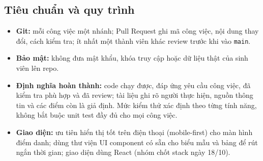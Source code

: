 \subsection*{Tiêu chuẩn và quy trình}
\begin{itemize}
  \item \textbf{Git:} mỗi công việc một nhánh; Pull Request ghi mã công việc, nội dung thay đổi, cách kiểm tra; ít nhất một thành viên khác review trước khi vào \texttt{main}.
  \item \textbf{Bảo mật:} không đưa mật khẩu, khóa truy cập hoặc dữ liệu thật của sinh viên lên repo.
  \item \textbf{Định nghĩa hoàn thành:} code chạy được, đáp ứng yêu cầu công việc, đã kiểm tra phù hợp và đã review; tài liệu ghi rõ người thực hiện, nguồn thông tin và các điểm còn là giả định. Mức kiểm thử xác định theo từng tính năng, không bắt buộc unit test đầy đủ cho mọi công việc.
  \item \textbf{Giao diện:} ưu tiên hiển thị tốt trên điện thoại (mobile-first) cho màn hình điểm danh; dùng thư viện UI component có sẵn cho biểu mẫu và bảng để rút ngắn thời gian; giao diện dùng React (nhóm chốt stack ngày 18/10).
\end{itemize}

